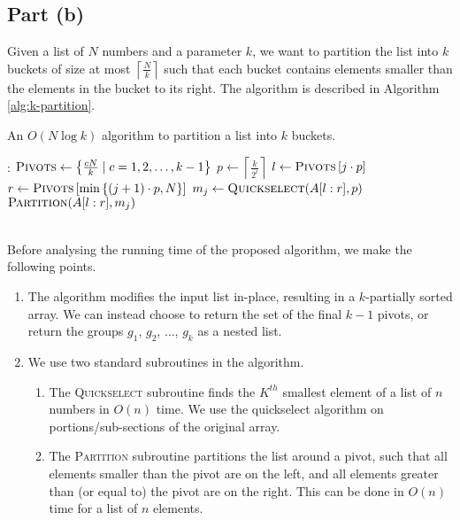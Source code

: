 \documentclass[9pt]{article}
\begin{document}
\subsection*{Part (b)}
Given a list of $N$ numbers and a parameter $k$, we want to partition the list into $k$ buckets
of size at most $\left\lceil \frac{N}{k} \right\rceil$ such that each bucket contains elements
smaller than the elements in the bucket to its right. The algorithm is described in Algorithm
\ref{alg:k-partition}.
\begin{algorithm}
    \caption{An $O(N \log{k})$ algorithm to partition a list into $k$ buckets.}
    \label{alg:k-partition}
    \begin{algorithmic}[1]
        :
            \State $\textsc{Pivots} \gets \left\{ \frac{cN}{k} \mid c = 1, 2, \dots, k-1 \right\}$
                    \State $p \gets \left\lceil \frac{k}{2^{i}} \right\rceil$
                    \State $l \gets \textsc{Pivots} \left[ j \cdot p \right]$
                    \State $r \gets \textsc{Pivots} \left[ \min\left\{ (j+1) \cdot p, N \right\} \right]$
                    \State $m_{j} \gets \Call{Quickselect}{A[l:r], p}$
                    \State $\Call{Partition}{A[l:r], m_{j}}$
                \EndFor
            \EndFor
        \EndProcedure
    \end{algorithmic}
\end{algorithm}
\vspace*{0pt} \\
Before analysing the running time of the proposed algorithm, we make the following points.
\begin{enumerate}
    \item The algorithm modifies the input list in-place, resulting in a $k$-partially
    sorted array. We can instead choose to return the set of the final $k-1$ pivots, or return
    the groups $g_{1}$, $g_{2}$, $\dots$, $g_{k}$ as a nested list.
    \item We use two standard subroutines in the algorithm.
    \begin{enumerate}
        \item The \textsc{Quickselect} subroutine finds the $K^{th}$ smallest element of a
        list of $n$ numbers in $O(n)$ time. We use the quickselect algorithm on portions/sub-sections
        of the original array.
        \item The \textsc{Partition} subroutine partitions the list around a pivot, such
        that all elements smaller than the pivot are on the left, and all elements greater
        than (or equal to) the pivot are on the right. This can be done in $O(n)$ time for
        a list of $n$ elements.
    \end{enumerate}
\end{enumerate}
\end{document}
